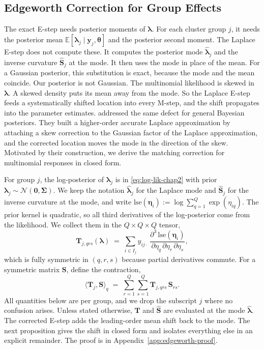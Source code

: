 \subsection{Edgeworth Correction for Group Effects}
\label{subsec:corrected-lambda}

The exact E-step needs posterior moments of $\bm{\lambda}$. For each cluster group $j$, it needs the posterior mean $\mathbb{E}\left[\bm{\lambda}_j \mid \bm{y}_j,  \bm{\theta}\right]$ and the posterior second moment. The Laplace E-step does not compute these. It computes the posterior mode $\hat{\bm{\lambda}}_j$ and the inverse curvature $\hat{\mathbf{S}}_j$ at the mode. It then uses the mode in place of the mean. For a Gaussian posterior, this substitution is exact, because the mode and the mean coincide. Our posterior is not Gaussian. The multinomial likelihood is skewed in $\bm{\lambda}$. A skewed density puts its mean away from the mode. So the Laplace E-step feeds a systematically shifted location into every M-step, and the shift propagates into the parameter estimates. \citet{katsevich2024} addressed the same defect for general Bayesian posteriors. They built a higher-order accurate Laplace approximation by attaching a skew correction to the Gaussian factor of the Laplace approximation, and the corrected location moves the mode in the direction of the skew. Motivated by their construction, we derive the matching correction for multinomial responses in closed form.

For group $j$, the log-posterior of $\bm{\lambda}_{j}$ is in \eqref{eq:log-lik-chap2} with prior $\bm{\lambda}_{j}\sim\mathcal{N}(\bm{0},\bm{\Sigma})$. We keep the notation $\hat{\bm{\lambda}}_{j}$ for the Laplace mode and $\hat{\mathbf{S}}_{j}$ for the inverse curvature at the mode, and write $\mathrm{lse}(\bm{\eta}_{i}):=\log\sum_{q=1}^{Q}\exp(\eta_{iq})$. The prior kernel is quadratic, so all third derivatives of the log-posterior come from the likelihood. We collect them in the $Q\times Q\times Q$ tensor,
\begin{equation}
    \mathbf{T}_{j,qrs}\left(\bm{\lambda}\right) \;=\; \sum_{i \in I_j} y_{ij\cdot}\, \frac{\partial^3\, \mathrm{lse}(\bm{\eta}_i)}{\partial \eta_q\, \partial \eta_r\, \partial \eta_s},
    \label{eq:third-tensor}
\end{equation}
which is fully symmetric in $(q,r,s)$ because partial derivatives commute. For a symmetric matrix $\mathbf{S}$, define the contraction,
\begin{equation}
    \big\langle \mathbf{T}_j, \mathbf{S} \big\rangle_q \;=\; \sum_{r=1}^Q \sum_{s=1}^Q \mathbf{T}_{j,qrs}\, \mathbf{S}_{rs}.
    \label{eq:T-contraction}
\end{equation}
All quantities below are per group, and we drop the subscript $j$ where no confusion arises. Unless stated otherwise, $\mathbf{T}$ and $\hat{\mathbf{S}}$ are evaluated at the mode $\hat{\bm{\lambda}}$. The corrected E-step adds the leading-order mean shift back to the mode. The next proposition gives the shift in closed form and isolates everything else in an explicit remainder. The proof is in Appendix~\ref{app:edgeworth-proof}.

